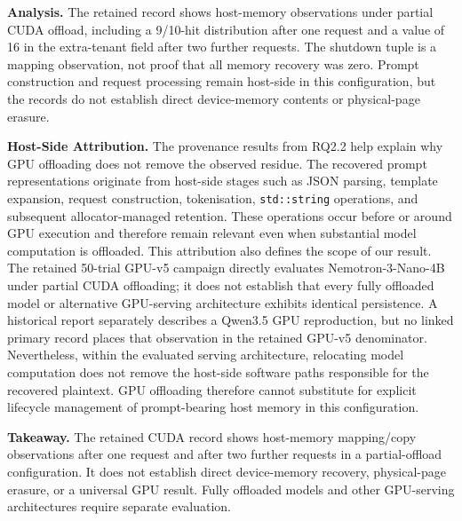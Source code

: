 \documentclass[journal,tifs]{IEEEtran}
\begin{document}

{\bf Analysis.}
The retained record shows host-memory observations under partial CUDA
offload, including a 9/10-hit distribution after one request and a value
of 16 in the extra-tenant field after two further requests. The shutdown
tuple is a mapping observation, not proof that all memory recovery was
zero. Prompt construction and request processing remain host-side in this
configuration, but the records do not establish direct device-memory
contents or physical-page erasure.


{\bf Host-Side Attribution.}
The provenance results from RQ2.2 help explain why GPU offloading does
not remove the observed residue. The recovered prompt representations
originate from host-side stages such as JSON parsing, template expansion,
request construction, tokenisation, \texttt{std::string} operations, and
subsequent allocator-managed retention. These operations occur before or
around GPU execution and therefore remain relevant even when substantial
model computation is offloaded. This attribution also defines the scope of
our result. The retained 50-trial GPU-v5 campaign directly evaluates
Nemotron-3-Nano-4B under partial CUDA offloading; it does not establish that
every fully offloaded model or alternative GPU-serving architecture exhibits
identical persistence. A historical report separately describes a Qwen3.5
GPU reproduction, but no linked primary record places that observation in
the retained GPU-v5 denominator. Nevertheless, within the
evaluated serving architecture, relocating model computation does not
remove the host-side software paths responsible for the recovered
plaintext. GPU offloading therefore cannot substitute for explicit
lifecycle management of prompt-bearing host memory in this configuration.


{\bf Takeaway.}
The retained CUDA record shows host-memory mapping/copy observations after
one request and after two further requests in a partial-offload
configuration. It does not establish direct device-memory recovery,
physical-page erasure, or a universal GPU result. Fully offloaded models
and other GPU-serving architectures require separate evaluation.
\end{document}
